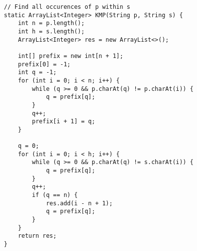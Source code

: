 \begin{verbatim}
// Find all occurences of p within s
static ArrayList<Integer> KMP(String p, String s) {
	int n = p.length();
	int h = s.length();
	ArrayList<Integer> res = new ArrayList<>();

	int[] prefix = new int[n + 1];
	prefix[0] = -1;
	int q = -1;
	for (int i = 0; i < n; i++) {
		while (q >= 0 && p.charAt(q) != p.charAt(i)) {
			q = prefix[q];
		}
		q++;
		prefix[i + 1] = q;
	}

	q = 0;
	for (int i = 0; i < h; i++) {
		while (q >= 0 && p.charAt(q) != s.charAt(i)) {
			q = prefix[q];
		}
		q++;
		if (q == n) {
			res.add(i - n + 1);
			q = prefix[q];
		}
	}
	return res;
}
\end{verbatim}